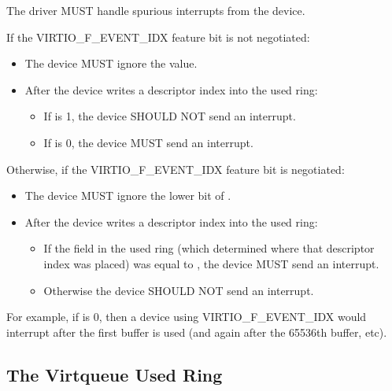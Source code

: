 The driver MUST handle spurious interrupts from the device.


If the VIRTIO_F_EVENT_IDX feature bit is not negotiated:
\begin{itemize}
\item The device MUST ignore the  value.
\item After the device writes a descriptor index into the used ring:
  \begin{itemize}
  \item If  is 1, the device SHOULD NOT send an interrupt.
  \item If  is 0, the device MUST send an interrupt.
  \end{itemize}
\end{itemize}

Otherwise, if the VIRTIO_F_EVENT_IDX feature bit is negotiated:
\begin{itemize}
\item The device MUST ignore the lower bit of .
\item After the device writes a descriptor index into the used ring:
  \begin{itemize}
  \item If the  field in the used ring (which determined
    where that descriptor index was placed) was equal to
    , the device MUST send an interrupt.
  \item Otherwise the device SHOULD NOT send an interrupt.
  \end{itemize}
\end{itemize}

\begin{note}
For example, if  is 0, then a device using
  VIRTIO_F_EVENT_IDX would interrupt after the first buffer is
  used (and again after the 65536th buffer, etc).
\end{note}

\subsection{The Virtqueue Used Ring}\label{sec:Basic Facilities of a Virtio Device / Virtqueues / The Virtqueue Used Ring}


